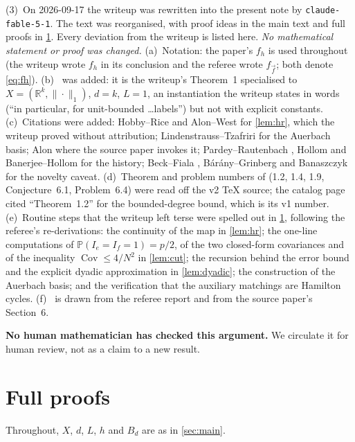 \documentclass[11pt,a4paper]{article}
\theoremstyle{plain}
\theoremstyle{definition}
\theoremstyle{remark}
\newcommand{\R}{\mathbb R}
\newcommand{\Prob}{\mathbb P}
\newcommand{\Cov}{\operatorname{Cov}}
\begin{document}
(3)~On 2026-09-17 the writeup was rewritten into the present note by \texttt{claude-fable-5-1}. The text was reorganised, with proof ideas in the main text and full proofs in \cref{app:proofs}. Every deviation from the writeup is listed here. \emph{No mathematical statement or proof was changed.} (a)~Notation: the paper's $f_h$ is used throughout (the writeup wrote $f_h$ in its conclusion and the referee wrote $f_{\vec f}$; both denote \eqref{eq:fh}). (b)~ was added: it is the writeup's Theorem~1 specialised to $X=(\R^k,\|\cdot\|_1)$, $d=k$, $L=1$, an instantiation the writeup states in words (``in particular, for unit-bounded \dots labels'') but not with explicit constants. (c)~Citations were added: Hobby--Rice \cite{HobbyRice65} and Alon--West \cite{AlonWest86} for \cref{lem:hr}, which the writeup proved without attribution; Lindenstrauss--Tzafriri \cite{LT77} for the Auerbach basis; Alon \cite{Alon87} where the source paper invokes it; Pardey--Rautenbach \cite{PR22}, Hollom \cite{Hol25} and Banerjee--Hollom \cite{BH26} for the history; Beck--Fiala \cite{BeckFiala81}, Bárány--Grinberg \cite{BaranyGrinberg81} and Banaszczyk \cite{Banaszczyk98} for the novelty caveat. (d)~Theorem and problem numbers of \cite{HST26} (1.2, 1.4, 1.9, Conjecture~6.1, Problem~6.4) were read off the v2 TeX source; the catalog page cited ``Theorem~1.2'' for the bounded-degree bound, which is its v1 number. (e)~Routine steps that the writeup left terse were spelled out in \cref{app:proofs}, following the referee's re-derivations: the continuity of the map in \cref{lem:hr}; the one-line computations of $\Prob(I_e=I_f=1)=p/2$, of the two closed-form covariances and of the inequality $\Cov\le4/N^2$ in \cref{lem:cut}; the recursion behind the error bound and the explicit dyadic approximation in \cref{lem:dyadic}; the construction of the Auerbach basis; and the verification that the auxiliary matchings are Hamilton cycles. (f)~ is drawn from the referee report and from the source paper's Section~6.

\textbf{No human mathematician has checked this argument.} We circulate it for human review, not as a claim to a new result.

\appendix

\section{Full proofs}\label{app:proofs}

Throughout, $X$, $d$, $L$, $h$ and $B_d$ are as in \cref{sec:main}.
\end{document}
